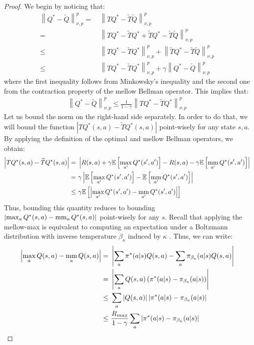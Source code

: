 \documentclass{article}
\newcommand{\mm}{\operatornamewithlimits{mm}}
\newcommand{\wt}[1]{\widetilde{#1}}
\newcommand{\norm}[1]{\left\lVert #1 \right\rVert}
\newcommand{\abs}[1]{\left\lvert #1 \right\rvert}
\begin{document}
\thmm*
\begin{proof}
We begin by noticing that:
\begin{align*}
\norm{Q^*-\wt{Q}}_{\nu,p}^p =\ & \norm{TQ^* - \wt{T}\wt{Q}}_{\nu,p}^p \\ =\ &
\norm{TQ^* - \wt{T}Q^* + \wt{T}Q^* - \wt{T}\wt{Q}}_{\nu,p}^p \\ \leq\ &
\norm{TQ^* - \wt{T}Q^*}_{\nu,p}^p + \norm{\wt{T}Q^* - \wt{T}\wt{Q}}_{\nu,p}^p \\ \leq\ &
\norm{TQ^* - \wt{T}Q^*}_{\nu,p}^p + \gamma\norm{Q^* - \wt{Q}}_{\nu,p}^p
\end{align*}
where the first inequality follows from Minkowsky's inequality and the second one from the contraction property of the mellow Bellman operator. This implies that:
\begin{align} \label{eq:mm1}
\norm{Q^*-\wt{Q}}_{\nu,p}^p \leq \frac{1}{1-\gamma}\norm{TQ^* - \wt{T}Q^*}_{\nu,p}^p
\end{align}
Let us bound the norm on the right-hand side separately. In order to do that, we will bound the function $\abs{TQ^*(s,a) - \wt{T}Q^*(s,a)}$ point-wisely for any state $s,a$. By applying the definition of the optimal and mellow Bellman operators, we obtain:
\begin{align} \label{eq:mm5}
\abs{TQ^*(s,a) - \wt{T}Q^*(s,a)} =\ & \abs{R(s,a) + \gamma\mathbb{E}\left[\max_{a'}Q^*(s',a')\right] - R(s,a) - \gamma\mathbb{E}\left[\mm_{a'}Q^*(s',a')\right]}\notag \\ =\ & \gamma\abs{\mathbb{E}\left[\max_{a'}Q^*(s',a')\right] - \mathbb{E}\left[\mm_{a'}Q^*(s',a')\right]}\notag \\ \leq\ & \gamma\mathbb{E}\left[\abs{\max_{a'}Q^*(s',a') - \mm_{a'}Q^*(s',a')}\right]
\end{align}
Thus, bounding this quantity reduces to bounding $\abs{\max_{a}Q^*(s,a) - \mm_{a}Q^*(s,a)}$ point-wisely for any $s$. Recall that applying the mellow-max is equivalent to computing an expectation under a Boltzmann distribution with inverse temperature $\beta_{\kappa}$ induced by $\kappa$ \cite{}. Thus, we can write:
\begin{align} \label{eq:mm2}
\abs{\max_a Q(s,a) - \mm_a Q(s,a)} =\ & \abs{\sum_a \pi^*(a|s)Q(s,a) - \sum_a \pi_{\beta_{\kappa}}(a|s)Q(s,a)}\notag\\ =\ & \abs{\sum_a Q(s,a) \left( \pi^*(a|s) - \pi_{\beta_{\kappa}}(a|s)  \right)}\notag\\ \leq\ & \sum_a \abs{Q(s,a)} \abs{\pi^*(a|s) - \pi_{\beta_{\kappa}}(a|s)}\notag\\ \leq\ & \frac{R_{max}}{1-\gamma}\sum_a\abs{\pi^*(a|s) - \pi_{\beta_{\kappa}}(a|s)}

\end{align}
\end{proof}
\end{document}
